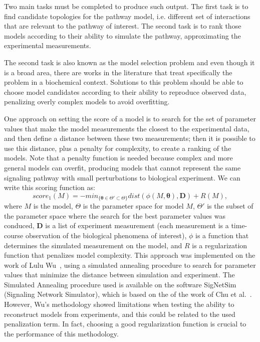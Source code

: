 Two main tasks must be completed to produce such output. The first task
is to find candidate topologies for the pathway model, i.e. different
set of interactions that are relevant to the pathway of interest. The
second task is to rank those models according to their ability to 
simulate the pathway, approximating the experimental measurements.


The second task is also known as the model selection problem and even
though it is a broad area, there are works in the literature that treat 
specifically the problem in a biochemical context. Solutions to this 
problem should be able to choose model candidates according to their 
ability to reproduce observed data, penalizing overly complex models 
to avoid overfitting. 

One approach on setting the score of a model is to search for the set of 
parameter values that make the model measurements the closest to the 
experimental data, and then define a distance between these two 
measurements; then it is possible to use this distance, plus a penalty 
for complexity, to create a ranking of the models. Note that a penalty 
function is needed because complex and more general models can overfit,
producing models that cannot represent the same signaling pathway with
small perturbations to biological experiment. We can write this scoring 
function as:
\begin{equation*}
    score_1 (M) = - min_{\{{\boldsymbol \theta} \in \Theta' \subset
        \Theta\}} dist (\phi(M, {\bm \theta}), {\bm D}) + R (M),
\end{equation*}
where $M$ is the model, $\Theta$ is the parameter space for model $M$, 
$\Theta'$ is the subset of the parameter space where the search for the
best parameter values was conduced, ${\bm D}$ is a list of experiment
measurement (each measurement is a time-course observation of the
biological phenomena of interest), $\phi$ is a function that determines
the simulated measurement on the model, and $R$ is a regularization
function that penalizes model complexity. This approach was implemented
on the work of Lulu Wu~\cite{Wu15}, using a simulated annealing
procedure to search for parameter values that minimize the distance
between simulation and experiment. The Simulated Annealing procedure
used is available on the software SigNetSim (Signaling Network
Simulator), which is based on the of the work of Chu et al.~\cite{Chu1999}.
However, Wu's methodology showed limitations when testing the ability to
reconstruct models from experiments, and this could be related to the
used penalization term. In fact, choosing a good regularization function
is crucial to the performance of this methodology.


